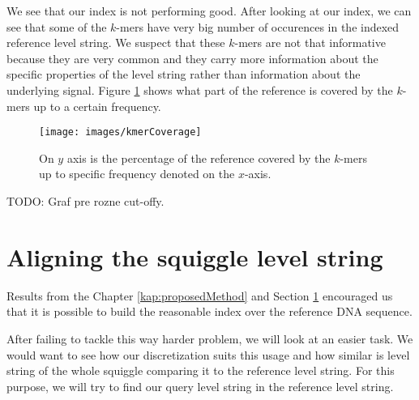 We see that our index is not performing good. After looking at our index, we can
see that some of the $k$-mers have very big number of occurences in the indexed
reference level string. We suspect that these $k$-mers are not that informative
because they are very common and they carry more information about the specific
properties of the level string rather than information about the underlying signal.
Figure \ref{obr:kmerCoverage} shows what part of the reference is covered by the $k$-mers
up to a certain frequency.

\begin{figure}
\centerline{\texttt{[image: images/kmerCoverage]}}
\caption[TODO]{On $y$ axis is the percentage of the reference covered by the $k$-mers up to specific frequency
denoted on the $x$-axis.}
\label{obr:kmerCoverage}
\end{figure}

TODO: Graf pre rozne cut-offy.

\section{Aligning the squiggle level string}
\label{section:alignMinimap}

Results from the Chapter \ref{kap:proposedMethod} and Section \ref{section:alignMinimap}
encouraged us that it is possible to build the reasonable index over the reference
DNA sequence.

After failing to tackle this way harder problem, we will look at an easier task. We would want to see how
our discretization suits this usage and how similar is level string of the whole squiggle
comparing it to the reference level string. For this purpose, we will try to
find our query level string in the reference level string.

